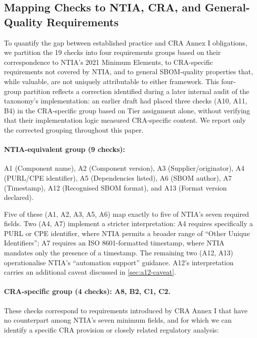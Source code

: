\documentclass[11pt]{article}
\begin{document}
\subsection{Mapping Checks to NTIA, CRA, and General-Quality Requirements}
\label{sec:taxonomy}

To quantify the gap between established practice and CRA Annex I obligations, we partition the 19 checks into four requirements groups based on their correspondence to NTIA's 2021 Minimum Elements, to CRA-specific requirements not covered by NTIA, and to general SBOM-quality properties that, while valuable, are not uniquely attributable to either framework. This four-group partition reflects a correction identified during a later internal audit of the taxonomy's implementation: an earlier draft had placed three checks (A10, A11, B4) in the CRA-specific group based on Tier assignment alone, without verifying that their implementation logic measured CRA-specific content. We report only the corrected grouping throughout this paper.

\paragraph{NTIA-equivalent group (9 checks):} A1 (Component name), A2 (Component version), A3 (Supplier/originator), A4 (PURL/CPE identifier), A5 (Dependencies listed), A6 (SBOM author), A7 (Timestamp), A12 (Recognised SBOM format), and A13 (Format version declared).

Five of these (A1, A2, A3, A5, A6) map exactly to five of NTIA's seven required fields. Two (A4, A7) implement a stricter interpretation: A4 requires specifically a PURL or CPE identifier, where NTIA permits a broader range of ``Other Unique Identifiers''; A7 requires an ISO 8601-formatted timestamp, where NTIA mandates only the presence of a timestamp. The remaining two (A12, A13) operationalise NTIA's ``automation support'' guidance. A12's interpretation carries an additional caveat discussed in \cref{sec:a12-caveat}.

\paragraph{CRA-specific group (4 checks): A8, B2, C1, C2.} These checks correspond to requirements introduced by CRA Annex I that have no counterpart among NTIA's seven minimum fields, and for which we can identify a specific CRA provision or closely related regulatory analysis:
\end{document}
